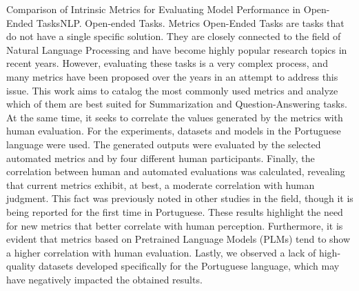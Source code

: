 \documentclass[cic,tc]{iiufrgs}
\begin{document}
\begin{englishabstract}{Comparison of Intrinsic Metrics for Evaluating Model Performance in Open-Ended Tasks}{NLP. Open-ended Tasks. Metrics}
    Open-Ended Tasks are tasks that do not have a single specific solution. They are closely connected to the field of Natural Language Processing and have become highly popular research topics in recent years. However, evaluating these tasks is a very complex process, and many metrics have been proposed over the years in an attempt to address this issue. This work aims to catalog the most commonly used metrics and analyze which of them are best suited for Summarization and Question-Answering tasks. At the same time, it seeks to correlate the values generated by the metrics with human evaluation. For the experiments, datasets and models in the Portuguese language were used. The generated outputs were evaluated by the selected automated metrics and by four different human participants. Finally, the correlation between human and automated evaluations was calculated, revealing that current metrics exhibit, at best, a moderate correlation with human judgment. This fact was previously noted in other studies in the field, though it is being reported for the first time in Portuguese. These results highlight the need for new metrics that better correlate with human perception. Furthermore, it is evident that metrics based on Pretrained Language Models (PLMs) tend to show a higher correlation with human evaluation. Lastly, we observed a lack of high-quality datasets developed specifically for the Portuguese language, which may have negatively impacted the obtained results.
\end{englishabstract}

\listoffigures

\listoftables
\end{document}
